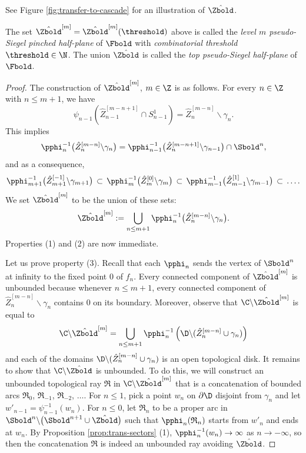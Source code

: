 \documentclass{amsart}
\begin{document}
See Figure \ref{fig:transfer-to-cascade} for an illustration of $\hat{\Zbold}$.

\begin{definition}
    The set $\hat{\Zbold}^{[m]} = \hat{\Zbold}^{[m]}(\threshold)$ above is called the \emph{level $m$ pseudo-Siegel pinched half-plane} of $\Fbold$ with \emph{combinatorial threshold} $\threshold \in \N$.
    The union $\hat{\Zbold}$ is called the \emph{top pseudo-Siegel half-plane} of $\Fbold$.
\end{definition}

\begin{proof}  
    The construction of $\hat{\Zbold}^{[m]}$, $m \in \Z$ is as follows.
    For every $n \in \Z$ with $n \leq m+1$, we have
    \[
    \psi_{n-1}(\hat{Z}_{n-1}^{[m-n+1]} \cap S_{n-1}^1) = \hat{Z}_{n}^{[m-n]} \backslash \gamma_n.
    \]
    This implies
    \[
        \pphi^{-1}_n \big( \hat{Z}_n^{[m-n]} \backslash \gamma_n \big) = 
        \pphi^{-1}_{n-1} \big( \hat{Z}_n^{[m-n+1]} \backslash \gamma_{n-1} \big) \cap \Sbold^n,
    \]
    and as a consequence, 
    \[
    \pphi_{m+1}^{-1} \big( \hat{Z}_{m+1}^{[-1]} \backslash \gamma_{m+1} \big) \, \subset \, 
    \pphi_{m}^{-1} \big( \hat{Z}_{m}^{[0]} \backslash \gamma_{m} \big) \, \subset \, 
    \pphi_{m-1}^{-1} \big( \hat{Z}_{m-1}^{[1]} \backslash \gamma_{m-1} \big) \, \subset \, \ldots.
    \]
    We set $\hat{\Zbold}^{[m]}$ to be the union of these sets:
    \[
        \hat{\Zbold}^{[m]} := \bigcup_{n \leq m+1} \pphi^{-1}_n \big( \hat{Z}_n^{[m-n]} \backslash \gamma_n \big).
    \]
    Properties (1) and (2) are now immediate.

    Let us prove property (3).
    Recall that each $\pphi_n$ sends the vertex of $\Sbold^n$ at infinity to the fixed point $0$ of $f_n$.
    Every connected component of $\hat{\Zbold}^{[m]}$ is unbounded because whenever $n \leq m+1$, every connected component of $\hat{Z}_n^{[m-n]} \backslash \gamma_n$ contains $0$ on its boundary.
    Moreover, observe that $\C \backslash \hat{\Zbold}^{[m]}$ is equal to
    \[
        \C \backslash \hat{\Zbold}^{[m]} = \bigcup_{n \leq m+1}  \pphi^{-1}_n \left( \D \backslash ( \hat{Z}_n^{[m-n]} \cup \gamma_n) \right)
    \]
    and each of the domains $\D \backslash ( \hat{Z}_n^{[m-n]} \cup \gamma_n)$ is an open topological disk.
    It remains to show that $\C \backslash \hat{\Zbold}$ is unbounded.
    To do this, we will construct an unbounded topological ray $\mathfrak{R}$ in $\C \backslash \hat{\Zbold}^{[m]}$ that is a concatenation of bounded arcs $\mathfrak{R}_0$, $\mathfrak{R}_{-1}$, $\mathfrak{R}_{-2}$, $\ldots$.
    For $n \leq 1$, pick a point $w_n$ on $\partial \D$ disjoint from $\gamma_n$ and let $w'_{n-1} = \psi_{n-1}^{-1}(w_n)$.
    For $n \leq 0$, let $\mathfrak{R}_n$ to be a proper arc in $\Sbold^{n} \backslash \big( \Sbold^{n+1} \cup \hat{\Zbold} \big)$ such that $\pphi_n(\mathfrak{R}_n)$ starts from $w'_{n}$ and ends at $w_n$.
    By Proposition \ref{prop:trans-sectors} (1), $\pphi_n^{-1}(w_n) \to \infty$ as $n \to - \infty$, so then the concatenation $\mathfrak{R}$ is indeed an unbounded ray avoiding $\hat{\Zbold}$.


\end{proof}
\end{document}
